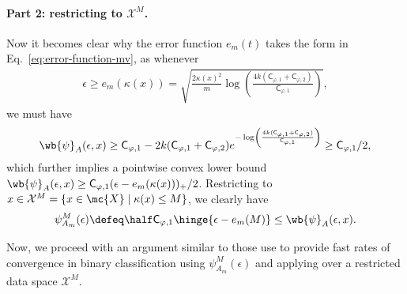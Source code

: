 \documentclass[11pt]{article}
\newcommand{\prn}[1]{\left({#1}\right)} %
\newcommand{\constant}{\mathsf{C}}  %
\newcommand{\sX}{\mathcal{X}} %
\newcommand{\sloss}{\varphi}  %
\begin{document}
\paragraph{Part 2: restricting to $\sX^M$.}
Now it becomes clear why the error function $e_m(t)$ takes the form in
Eq.~\eqref{eq:error-function-mv}, as whenever
\begin{align*}
  \epsilon \geq e_m(\kappa(x)) = 	 \sqrt{\frac{2\kappa(x)^2 }{m}\log \prn{ \frac{4k(\constant_{\sloss, 1}+\constant_{\sloss, 2})}{\constant_{\sloss, 1}}}},
\end{align*}
we must have
\begin{align*}
  \wb{\psi}_A(\epsilon, x)  \geq \constant_{\sloss, 1} - 2k(\constant_{\sloss, 1}+\constant_{\sloss, 2}) e^{-\log \prn{ \frac{4k(\constant_{\sloss, 1}+\constant_{\sloss, 2})}{\constant_{\sloss, 1}}}} \geq \constant_{\sloss, 1} / 2,
\end{align*}
which further implies a pointwise convex lower bound $\wb{\psi}_A(\epsilon,
x) \geq \constant_{\sloss, 1} (\epsilon - e_m(\kappa(x)))_+/ 2$.
%
Restricting to $x \in \sX^M = \{x \in \mc{X} \mid \kappa(x) \le M\}$,
we clearly have
\begin{align*}
  \psi_{A_m}^M(\epsilon) \defeq
  \half \constant_{\sloss, 1}
  \hinge{\epsilon - e_m(M)}
  \le \wb{\psi}_A(\epsilon, x).
\end{align*}

Now, we proceed with an argument similar to those
\citet{BartlettJoMc06} use to provide fast rates of convergence
in binary classification
using $\psi_{A_m}^M(\epsilon)$ and applying over a restricted
data space $\sX^M$.
\end{document}
